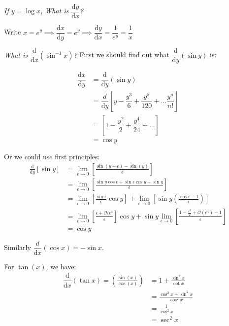 \documentclass[10pt]{scrartcl}
\begin{document}
\textit{If $y = \log x$, What is $\dfrac{\mathrm{d}y}{\mathrm{d}x}$?}

Write $x = e^y \implies \dfrac{\mathrm{d}x}{\mathrm{d}y} = e^y \implies \dfrac{\mathrm{d}y}{\mathrm{d}x} = \dfrac{1}{e^y} = \dfrac{1}{x}$\\


\textit{What is $\dfrac{\mathrm{d}}{\mathrm{d}x} (\sin^{-1} x)$?} First we should find out what  $\dfrac{\mathrm{d}}{\mathrm{d}y} (\sin y)$ is:

\[
\begin{aligned}
  \dfrac{\mathrm{d}x}{\mathrm{d}y} &= \dfrac{\mathrm{d}}{\mathrm{d}y}(\sin y) \\
&= \dfrac{d}{\mathrm{d}y}
\left[y - \dfrac{y^3}{6} + \dfrac{y^5}{120} + \dots \dfrac{y^n}{n!}\right] \\
&= \left[1 - \dfrac{y^2}{2} + \dfrac{y^4}{24} + \dots\right]\\
&= \cos y
\end{aligned}
\]

Or we could use first principles:
\begin{align*} \nonumber \frac{\mathrm{d}}{\mathrm{d}y}[\sin y] 
&= \lim_{\epsilon \to 0}
\left[\frac{\sin(y+\epsilon) - \sin(y)}{\epsilon} \right]\\
&=\lim_{\epsilon \to 0}
 \left[\frac{\sin y \cos \epsilon + \sin \epsilon \cos y - \sin y}{\epsilon} \right] 
 \\ \nonumber
&= \lim_{\epsilon \to 0}
\left[\frac{\sin \epsilon}{\epsilon}\cos y\right]
+ \lim_{\epsilon \to 0}
\left[\sin y \left(\frac{\cos \epsilon -1}{\epsilon} \right) \right]
\\ \nonumber
&=\lim_{\epsilon \to 0}
\left[\frac{\epsilon + \mathcal{O}(\epsilon^3}{\epsilon} \right]\cos y
+ \sin y \lim_{\epsilon \to 0}
\left[\frac{1-\frac{\epsilon^2}{2} + \mathcal{O}(\epsilon^4) -1}{\epsilon}\right]
\\ \nonumber
&= \cos y
\end{align*}


Similarly $\dfrac{d}{\mathrm{d}x}(\cos x) = -\sin x$. 

For $\tan(x)$, we have:
\[\begin{aligned}\dfrac{\mathrm{d}}{\mathrm{d}x}(\tan x) = \left(\frac{\sin(x)}{\cos(x)}\right)
&= 1 + \frac{\sin^2x}{\cot x}\\
&= \frac{\cos^2x + \sin^2x}{\cos^2x}\\
&= \frac{1}{\cos^2x}\\
&= \sec^2x
\end{aligned}\]
\end{document}
